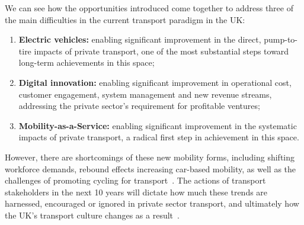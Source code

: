 \documentclass[b5paper,10pt]{article}
\begin{document}


We can see how the opportunities introduced come together to address
three of the main difficulties in the current transport paradigm in
the UK:

\begin{enumerate}
\item {\textbf{Electric vehicles:}} enabling significant improvement
in the direct, pump-to-tire impacts of private transport, one of the
most substantial steps toward long-term achievements in this space;
\item {\textbf{Digital innovation:}} enabling significant improvement
in operational cost, customer engagement, system management and new
revenue streams, addressing the private sector's requirement for
profitable ventures;
\item {\textbf{Mobility-as-a-Service:}} enabling significant
improvement in the systematic impacts of private transport, a radical
first step in achievement in this space.
\end{enumerate}

However, there are shortcomings of these new mobility forms, including
shifting workforce demands, rebound effects increasing car-based
mobility, as well as the challenges of promoting cycling for
transport~\citep{handy-et-al:2014}. The actions of transport
stakeholders in the next 10 years will dictate how much these trends
are harnessed, encouraged or ignored in private sector transport, and
ultimately how the UK's transport culture changes as a
result~\citep{rode-et-al:2017}.
\end{document}
